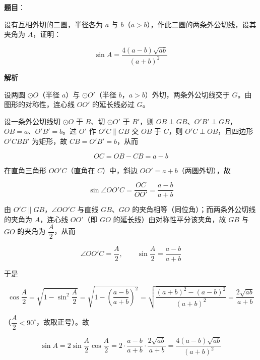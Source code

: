 \begin{answer}

\textbf{题目}：

设有互相外切的二圆，半径各为 $a$ 与 $b$（$a>b$），作此二圆的两条外公切线，设其夹角为 $A$，证明：

\nopagebreak[4]
\[
\sin A=\frac{4(a-b)\sqrt{ab}}{(a+b)^2}
\]

\textbf{解析}

设两圆 $\odot O$（半径 $a$）与 $\odot O'$（半径 $b$，$a>b$）外切，两条外公切线交于 $G$。由图形的对称性，连心线 $OO'$ 的延长线必过 $G$。

设一条外公切线切 $\odot O$ 于 $B$、切 $\odot O'$ 于 $B'$，则 $OB\perp GB$、$O'B'\perp GB$，$OB=a$、$O'B'=b$。过 $O'$ 作 $O'C\parallel GB$ 交 $OB$ 于 $C$，则 $O'C\perp OB$，且四边形 $O'CBB'$ 为矩形，故 $CB=O'B'=b$，从而

\nopagebreak[4]
\[
OC=OB-CB=a-b
\]

在直角三角形 $OO'C$（直角在 $C$）中，斜边 $OO'=a+b$（两圆外切），故

\nopagebreak[4]
\[
\sin\angle OO'C=\frac{OC}{OO'}=\frac{a-b}{a+b}
\]

由 $O'C\parallel GB$，$\angle OO'C$ 与直线 $GB$、$GO$ 的夹角相等（同位角）；而两条外公切线的夹角为 $A$，连心线 $OO'$（即 $GO$ 的延长线）由对称性平分该夹角，故 $GB$ 与 $GO$ 的夹角为 $\dfrac A2$，从而

\nopagebreak[4]
\[
\angle OO'C=\frac A2,\qquad \sin\frac A2=\frac{a-b}{a+b}
\]

于是

\nopagebreak[4]
\[
\cos\frac A2=\sqrt{1-\sin^2\frac A2}=\sqrt{1-\left(\frac{a-b}{a+b}\right)^2}=\sqrt{\frac{(a+b)^2-(a-b)^2}{(a+b)^2}}=\frac{2\sqrt{ab}}{a+b}
\]

（$\dfrac A2<90^\circ$，故取正号）。故

\nopagebreak[4]
\[
\sin A=2\sin\frac A2\cos\frac A2=2\cdot\frac{a-b}{a+b}\cdot\frac{2\sqrt{ab}}{a+b}=\frac{4(a-b)\sqrt{ab}}{(a+b)^2}
\]


\end{answer}
